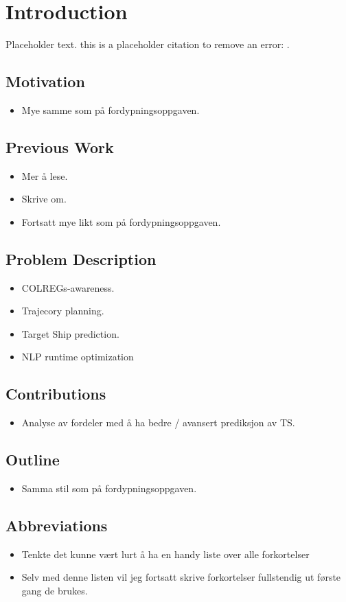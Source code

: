 \section{Introduction}
Placeholder text. this is a placeholder citation to remove an error: \cite{breivik2017mpc}.

\subsection{Motivation}
\begin{itemize}
    \item Mye samme som på fordypningsoppgaven.
\end{itemize}

\subsection{Previous Work}
\begin{itemize}
    \item Mer å lese.
    \item Skrive om.
    \item Fortsatt mye likt som på fordypningsoppgaven.
\end{itemize}

\subsection{Problem Description}
\begin{itemize}
    \item COLREGs-awareness.
    \item Trajecory planning.
    \item Target Ship prediction.
    \item NLP runtime optimization
\end{itemize}

\subsection{Contributions}
\begin{itemize}
    \item Analyse av fordeler med å ha bedre / avansert prediksjon av TS.
\end{itemize}

\subsection{Outline}
\begin{itemize}
    \item Samma stil som på fordypningsoppgaven.
\end{itemize}

\subsection{Abbreviations}
\begin{itemize}
    \item Tenkte det kunne vært lurt å ha en handy liste over alle forkortelser
    \item Selv med denne listen vil jeg fortsatt skrive forkortelser fullstendig ut første gang de brukes.
\end{itemize}

\newpage